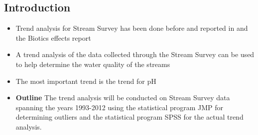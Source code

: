 \subsection{Introduction}
\begin{itemize}
	\item Trend analysis for Stream Survey has been done before and reported in \citep{robinson2008ph} and the Biotics effects report \citep{cai2012}
	\item A trend analysis of the data collected through the Stream Survey can be used to help determine the water quality of the streams
	\item The most important trend is the trend for pH
	\item {\bf Outline} The trend analysis will be conducted on Stream Survey data spanning the years 1993-2012 using the statistical program JMP 
	for determining outliers and the statistical program SPSS for the actual trend analysis.
\end{itemize}
